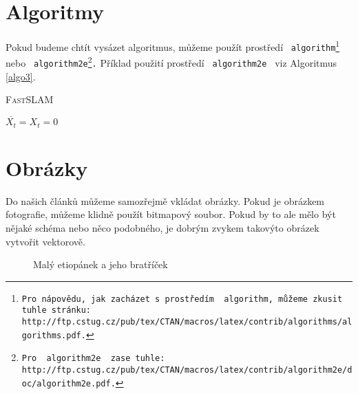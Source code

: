 \documentclass[a4paper, 11pt]{article}
\begin{document}
	\section{Algoritmy}\label{sekce3}
	Pokud budeme chtít vysázet algoritmus, můžeme použít prostředí \texttt{ algorithm\footnote{Pro nápovědu, jak zacházet s prostředím \texttt{ algorithm,} můžeme zkusit tuhle stránku:\\ http://ftp.cstug.cz/pub/tex/CTAN/macros/latex/contrib/algorithms/algorithms.pdf.} } nebo \texttt{ algorithm2e\footnote{Pro \texttt{ algorithm2e } zase tuhle: http://ftp.cstug.cz/pub/tex/CTAN/macros/latex/contrib/algorithm2e/doc/algorithm2e.pdf.}.}
	Příklad použití prostředí \texttt{ algorithm2e } viz Algoritmus \ref{algo3}. 
	\bigskip
	\begin{algorithm}[h]\label{algo3}
    	\caption{\textsc{Fast}SLAM}
    	
        \SetNlSty{}{}{:}
        \SetInd{1em}{1em}
        \SetNlSkip{-1.2em}
        \BlankLine
        \Indp \Indp
            ${\overline{X_t} = X_t = 0}$ \\

    \end{algorithm}
   
    \section {Obrázky}
    Do našich článků můžeme samozřejmě vkládat obrázky. Pokud je obrázkem fotografie, můžeme klidně použít bitmapový soubor. Pokud by to ale mělo být nějaké schéma nebo něco podobného, je dobrým zvykem takovýto obrázek vytvořit vektorově.
    \begin{figure}[ht] 
            \caption{Malý etiopánek a jeho bratříček}
            \label{abrazek1}
    \end{figure}
    \newpage
    
\end{document}
